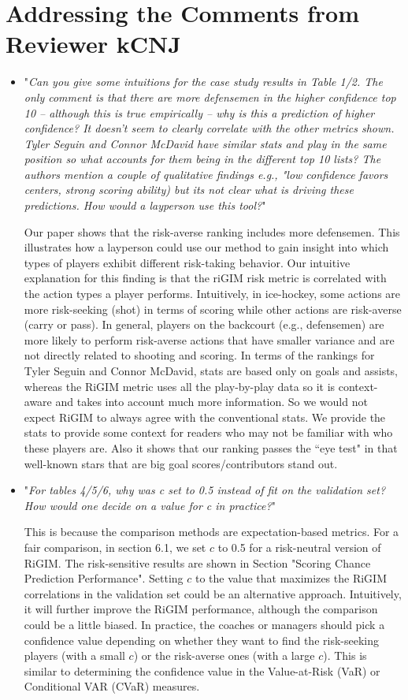 \documentclass[letterpaper]{article} %
\begin{document}
\section{Addressing the Comments from Reviewer kCNJ}
\begin{itemize}
    \item "{\it Can you give some intuitions for the case study results in Table 1/2. The only comment is that there are more defensemen in the higher confidence top 10 -- although this is true empirically -- why is this a prediction of higher confidence? It doesn't seem to clearly correlate with the other metrics shown. Tyler Seguin and Connor McDavid have similar stats and play in the same position so what accounts for them being in the different top 10 lists? The authors mention a couple of qualitative findings e.g., "low confidence favors centers, strong scoring ability) but its not clear what is driving these predictions. How would a layperson use this tool?}"
    
    Our paper shows that the risk-averse ranking includes more defensemen. This illustrates how a layperson could use our method to gain insight into which types of players exhibit different risk-taking behavior. Our intuitive explanation for this finding is that the riGIM risk metric is correlated with the action types a player performs. Intuitively, in ice-hockey, some actions are more risk-seeking (shot) in terms of scoring while other actions are risk-averse (carry or pass). In general, players on the backcourt (e.g., defensemen) are more likely to perform risk-averse actions that have smaller variance and are not directly related to shooting and scoring.
    In terms of the rankings for Tyler Seguin and Connor McDavid, stats are based only on goals and assists, whereas the RiGIM metric uses all the play-by-play data so it is context-aware and 
    takes into account much more information. So we would not expect RiGIM to always agree with the conventional stats. We provide the stats to provide some context for readers who may not be familiar with who these players are. Also it shows that our ranking passes the ``eye test" in that well-known stars that are big goal scores/contributors stand out.
    \medskip

    \item "{\it For tables 4/5/6, why was c set to 0.5 instead of fit on the validation set? How would one decide on a value for c in practice?}"
    
    This is because the comparison methods are expectation-based metrics. For a fair comparison, in section 6.1, we set $c$ to 0.5 for a risk-neutral version of RiGIM. The risk-sensitive results are shown in Section "Scoring Chance Prediction Performance". Setting $c$ to the value that maximizes the RiGIM correlations in the validation set could be an alternative approach. Intuitively, it will further improve the RiGIM performance, although the comparison could be a little biased. In practice, the coaches or managers should pick a confidence value depending on whether they want to find the risk-seeking players (with a small $c$) or the risk-averse ones (with a large $c$). This is similar to determining the confidence value in the Value-at-Risk (VaR) or Conditional VAR (CVaR) measures.
    \medskip


\end{itemize}
\end{document}
